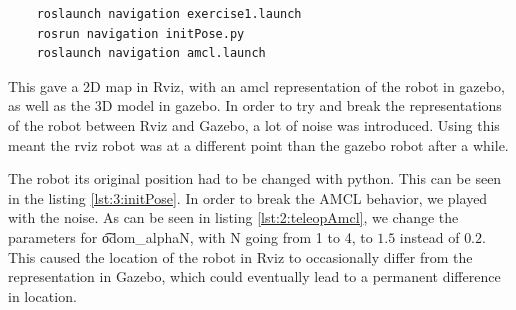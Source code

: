\begin{lstlisting}
	roslaunch navigation exercise1.launch
	rosrun navigation initPose.py
	roslaunch navigation amcl.launch
\end{lstlisting}

This gave a 2D map in Rviz, with an amcl representation of the robot in gazebo, as well as the 3D model in gazebo. In order to try and break the representations of the robot between Rviz and Gazebo, a lot of noise was introduced. Using this meant the rviz robot was at a different point than the gazebo robot after a while.





The robot its original position had to be changed with python. This can be seen in the listing \ref{lst:3:initPose}. In order to break the AMCL behavior, we played with the noise. As can be seen in listing \ref{lst:2:teleopAmcl}, we change the parameters for \t{odom_alphaN}, with N going from 1 to 4, to $1.5$ instead of $0.2$. This caused the location of the robot in Rviz to occasionally differ from the representation in Gazebo, which could eventually lead to a permanent difference in location.